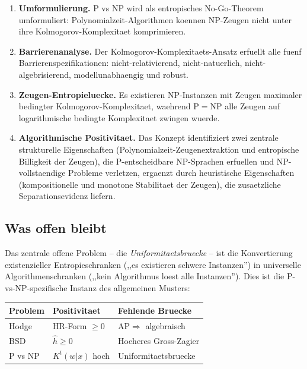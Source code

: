 \documentclass[aps,prd,twocolumn,superscriptaddress,nofootinbib]{revtex4-2}
\theoremstyle{definition}
\theoremstyle{remark}
\newcommand{\NP}{\mathrm{NP}}
\newcommand{\PP}{\mathrm{P}}
\begin{document}
\begin{enumerate}
\item \textbf{Umformulierung.} $\PP$ vs $\NP$ wird als entropisches No-Go-Theorem umformuliert: Polynomialzeit-Algorithmen koennen NP-Zeugen nicht unter ihre Kolmogorov-Komplexitaet komprimieren.

\item \textbf{Barrierenanalyse.} Der Kolmogorov-Komplexitaets-Ansatz erfuellt alle fuenf Barrierenspezifikationen: nicht-relativierend, nicht-natuerlich, nicht-algebrisierend, modellunabhaengig und robust.

\item \textbf{Zeugen-Entropieluecke.} Es existieren NP-Instanzen mit Zeugen maximaler bedingter Kolmogorov-Komplexitaet, waehrend $\PP = \NP$ alle Zeugen auf logarithmische bedingte Komplexitaet zwingen wuerde.

\item \textbf{Algorithmische Positivitaet.} Das Konzept identifiziert zwei zentrale strukturelle Eigenschaften (Polynomialzeit-Zeugenextraktion und entropische Billigkeit der Zeugen), die $\PP$-entscheidbare NP-Sprachen erfuellen und NP-vollstaendige Probleme verletzen, ergaenzt durch heuristische Eigenschaften (kompositionelle und monotone Stabilitaet der Zeugen), die zusaetzliche Separationsevidenz liefern.
\end{enumerate}

\subsection{Was offen bleibt}

Das zentrale offene Problem -- die \textit{Uniformitaetsbruecke} -- ist die Konvertierung existenzieller Entropieschranken (,,es existieren schwere Instanzen'') in universelle Algorithmenschranken (,,kein Algorithmus loest alle Instanzen''). Dies ist die P-vs-NP-spezifische Instanz des allgemeinen Musters:

\begin{center}
\begin{tabular}{lll}
\hline
Problem & Positivitaet & Fehlende Bruecke \\
\hline
Hodge & HR-Form $\geq 0$ & $\mathrm{AP} \Rightarrow$ algebraisch \\
BSD & $\hat{h} \geq 0$ & Hoeheres Gross-Zagier \\
P vs NP & $K^t(w|x)$ hoch & Uniformitaetsbruecke \\
\hline
\end{tabular}
\end{center}
\end{document}
